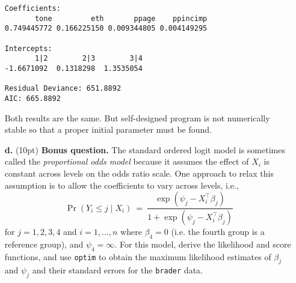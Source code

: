 \documentclass[11pt,english]{article}
\begin{document}
\begin{itemize}
\begin{verbatim}
Coefficients:
       tone         eth       ppage    ppincimp
0.749445772 0.166225150 0.009344805 0.004149295

Intercepts:
       1|2        2|3        3|4
-1.6671092  0.1318298  1.3535054

Residual Deviance: 651.8892
AIC: 665.8892
\end{verbatim}
Both results are the same.  But self-designed program is not numerically stable so that a proper initial parameter must be found.\\
\item[{\bf d.}] (10pt) {\bf Bonus question.} The standard ordered logit model is sometimes called the {\it proportional odds model} because it assumes the effect of $X_i$ is constant across levels on the odds ratio scale. One approach to relax this assumption is to allow the coefficients to vary across levels, i.e.,
        $$ \Pr(Y_i \leq j \mid X_i) \ = \ \frac{\exp(\psi_j - X_i^\top\beta_j)}
            {1 + \exp(\psi_j - X_i^\top\beta_j)} $$
for $j = 1,2,3,4$ and $i = 1,...,n$ where $\beta_4=0$ (i.e. the fourth group is a reference group), and $\psi_4=\infty$. For this model, derive the likelihood and score functions, and use {\tt optim} to obtain the maximum likelihood estimates of $\beta_j$ and $\psi_j$ and their standard errors for the {\tt brader} data.\\


\end{itemize}
\end{document}
